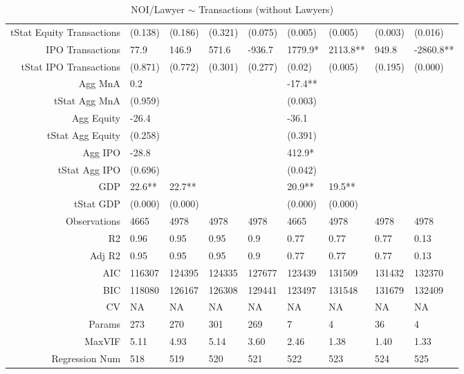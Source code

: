 \begin{table}[ht]
\begin{tabular}{rllllllll}
  tStat Equity Transactions & (0.138) & (0.186) & (0.321) & (0.075) & (0.005) & (0.005) & (0.003) & (0.016) \\ 
  IPO Transactions & 77.9 & 146.9 & 571.6 & -936.7 & 1779.9* & 2113.8** & 949.8 & -2860.8** \\ 
  tStat IPO Transactions & (0.871) & (0.772) & (0.301) & (0.277) & (0.02) & (0.005) & (0.195) & (0.000) \\ 
  Agg MnA & 0.2 &  &  &  & -17.4** &  &  &  \\ 
  tStat Agg MnA & (0.959) &  &  &  & (0.003) &  &  &  \\ 
  Agg Equity & -26.4 &  &  &  & -36.1 &  &  &  \\ 
  tStat Agg Equity & (0.258) &  &  &  & (0.391) &  &  &  \\ 
  Agg IPO & -28.8 &  &  &  & 412.9* &  &  &  \\ 
  tStat Agg IPO & (0.696) &  &  &  & (0.042) &  &  &  \\ 
  GDP & 22.6** & 22.7** &  &  & 20.9** & 19.5** &  &  \\ 
  tStat GDP & (0.000) & (0.000) &  &  & (0.000) & (0.000) &  &  \\ 
  Observations & 4665 & 4978 & 4978 & 4978 & 4665 & 4978 & 4978 & 4978 \\ 
  R2 & 0.96 & 0.95 & 0.95 & 0.9 & 0.77 & 0.77 & 0.77 & 0.13 \\ 
  Adj R2 & 0.95 & 0.95 & 0.95 & 0.9 & 0.77 & 0.77 & 0.77 & 0.13 \\ 
  AIC & 116307 & 124395 & 124335 & 127677 & 123439 & 131509 & 131432 & 132370 \\ 
  BIC & 118080 & 126167 & 126308 & 129441 & 123497 & 131548 & 131679 & 132409 \\ 
  CV & NA & NA & NA & NA & NA & NA & NA & NA \\ 
  Params & 273 & 270 & 301 & 269 & 7 & 4 & 36 & 4 \\ 
  MaxVIF & 5.11 & 4.93 & 5.14 & 3.60 & 2.46 & 1.38 & 1.40 & 1.33 \\ 
  Regression Num & 518 & 519 & 520 & 521 & 522 & 523 & 524 & 525 \\ 
   \hline
\end{tabular}
\caption{NOI/Lawyer $\sim$ Transactions (without Lawyers)} 
\end{table}
